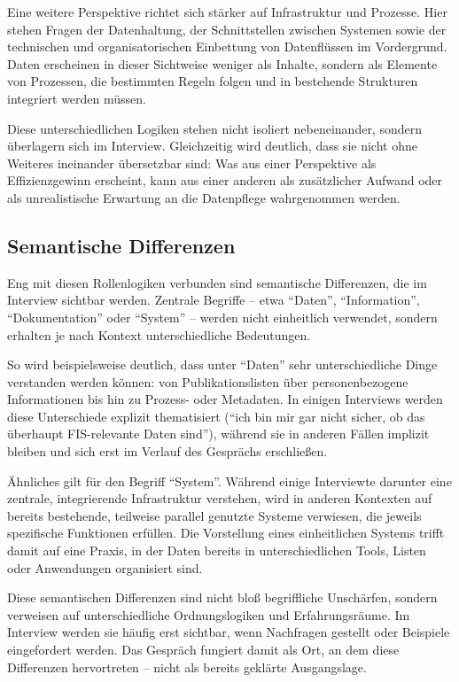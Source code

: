 \documentclass[a4paper,
fontsize=11pt,
oneside,
numbers=noperiodatend,
parskip=half-,
bibliography=totoc,
final
]{scrartcl}
\begin{document}
Eine weitere Perspektive richtet sich stärker auf Infrastruktur und
Prozesse. Hier stehen Fragen der Datenhaltung, der Schnittstellen
zwischen Systemen sowie der technischen und organisatorischen Einbettung
von Datenflüssen im Vordergrund. Daten erscheinen in dieser Sichtweise
weniger als Inhalte, sondern als Elemente von Prozessen, die bestimmten
Regeln folgen und in bestehende Strukturen integriert werden müssen.

Diese unterschiedlichen Logiken stehen nicht isoliert nebeneinander,
sondern überlagern sich im Interview. Gleichzeitig wird deutlich, dass
sie nicht ohne Weiteres ineinander übersetzbar sind: Was aus einer
Perspektive als Effizienzgewinn erscheint, kann aus einer anderen als
zusätzlicher Aufwand oder als unrealistische Erwartung an die
Datenpflege wahrgenommen werden.

\subsection{Semantische Differenzen}\label{semantische-differenzen}

Eng mit diesen Rollenlogiken verbunden sind semantische Differenzen, die
im Interview sichtbar werden. Zentrale Begriffe -- etwa \enquote{Daten},
\enquote{Information}, \enquote{Dokumentation} oder \enquote{System} --
werden nicht einheitlich verwendet, sondern erhalten je nach Kontext
unterschiedliche Bedeutungen.

So wird beispielsweise deutlich, dass unter \enquote{Daten} sehr
unterschiedliche Dinge verstanden werden können: von Publikationslisten
über personenbezogene Informationen bis hin zu Pro\-zess- oder Metadaten.
In einigen Interviews werden diese Unterschiede explizit thematisiert
(\enquote{ich bin mir gar nicht sicher, ob das überhaupt FIS-relevante
Daten sind}), während sie in anderen Fällen implizit bleiben und sich
erst im Verlauf des Gesprächs erschließen.

Ähnliches gilt für den Begriff \enquote{System}. Während einige
Interviewte darunter eine zentrale, integrierende Infrastruktur
verstehen, wird in anderen Kontexten auf bereits bestehende, teilweise
parallel genutzte Systeme verwiesen, die jeweils spezifische Funktionen
erfüllen. Die Vorstellung eines einheitlichen Systems trifft damit auf
eine Praxis, in der Daten bereits in unterschiedlichen Tools, Listen
oder Anwendungen organisiert sind.

Diese semantischen Differenzen sind nicht bloß begriffliche Unschärfen,
sondern verweisen auf unterschiedliche Ordnungslogiken und
Erfahrungsräume. Im Interview werden sie häufig erst sichtbar, wenn
Nachfragen gestellt oder Beispiele eingefordert werden. Das Gespräch
fungiert damit als Ort, an dem diese Differenzen hervortreten -- nicht
als bereits geklärte Ausgangslage.
\end{document}
